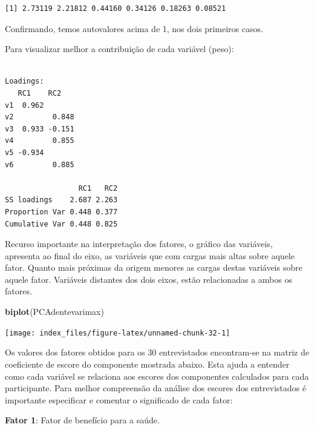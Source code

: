 \documentclass[12pt,brazil,oneside]{book}
\newenvironment{Shaded}{\begin{snugshade}}{\end{snugshade}}
\newcommand{\KeywordTok}[1]{\textcolor[rgb]{0.13,0.29,0.53}{\textbf{#1}}}
\newcommand{\NormalTok}[1]{#1}
\newcommand{\OperatorTok}[1]{\textcolor[rgb]{0.81,0.36,0.00}{\textbf{#1}}}
\begin{document}
\begin{verbatim}
[1] 2.73119 2.21812 0.44160 0.34126 0.18263 0.08521
\end{verbatim}

Confirmando, temos autovalores acima de 1, nos dois primeiros casos.

Para visualizar melhor a contribuição de cada variável (peso):

\begin{Shaded}
\end{Shaded}

\begin{verbatim}

Loadings:
   RC1    RC2   
v1  0.962       
v2         0.848
v3  0.933 -0.151
v4         0.855
v5 -0.934       
v6         0.885

                 RC1   RC2
SS loadings    2.687 2.263
Proportion Var 0.448 0.377
Cumulative Var 0.448 0.825
\end{verbatim}

Recurso importante na interpretação dos fatores, o gráfico das variáveis, apresenta ao final do eixo, as variáveis que com cargas mais altas sobre aquele fator. Quanto mais próximas da origem menores as cargas destas variáveis sobre aquele fator. Variáveis distantes dos dois eixos, estão relacionadas a ambos
os fatores.

\begin{Shaded}
\begin{Highlighting}[]
\KeywordTok{biplot}\NormalTok{(PCAdentevarimax)}
\end{Highlighting}
\end{Shaded}

\begin{center}\texttt{[image: index\_files/figure-latex/unnamed-chunk-32-1]} \end{center}

Os valores dos fatores obtidos para os 30 entrevistados encontram-se na matriz de coeficiente de escore do componente mostrada abaixo. Esta ajuda a entender como cada variável se relaciona aos escores dos componentes calculados para cada participante. Para melhor compreensão da análise dos escores dos entrevistados é importante especificar e comentar o significado de cada fator:

\textbf{Fator 1}: Fator de benefício para a saúde.
\end{document}
